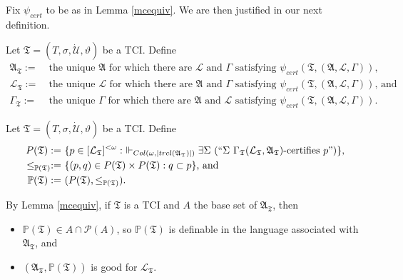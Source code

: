 \documentclass[12pt]{article}
\numberwithin{equation}{section}
\begin{document}
Fix $\psi_{cert}$ to be as in Lemma \ref{mcequiv}. We are then justified in our next definition.

\begin{defi}
Let $\mathfrak{T} = (T, \sigma, \dot{\mathcal{U}}, \vartheta)$ be a TCI. Define
\begin{align*}
    \mathfrak{A}_{\mathfrak{T}} := \ & \text{the unique } \mathfrak{A} \text{ for which there are } \mathcal{L} \text{ and } \Gamma \text{ satisfying } \psi_{cert}(\mathfrak{T}, (\mathfrak{A}, \mathcal{L}, \Gamma)) \text{,} \\
    \mathcal{L}_{\mathfrak{T}} := \ & \text{the unique } \mathcal{L} \text{ for which there are } \mathfrak{A} \text{ and } \Gamma \text{ satisfying } \psi_{cert}(\mathfrak{T}, (\mathfrak{A}, \mathcal{L}, \Gamma)) \text{, and} \\
    \Gamma_{\mathfrak{T}} := \ & \text{the unique } \Gamma \text{ for which there are } \mathfrak{A} \text{ and } \mathcal{L} \text{ satisfying } \psi_{cert}(\mathfrak{T}, (\mathfrak{A}, \mathcal{L}, \Gamma)) \text{.}
\end{align*}
\end{defi}

\begin{defi}
Let $\mathfrak{T} = (T, \sigma, \dot{\mathcal{U}}, \vartheta)$ be a TCI. Define \begin{align*}
    P(\mathfrak{T}) := \ & \{p \in [\mathcal{L}_{\mathfrak{T}}]^{< \omega} : \ \Vdash_{Col(\omega, |trcl(\mathfrak{A}_{\mathfrak{T}})|)} \exists \Sigma \ (``\Sigma \ \Gamma_{\mathfrak{T}} (\mathcal{L}_{\mathfrak{T}}, \mathfrak{A}_{\mathfrak{T}})\text{-certifies } p")\} \text{,} \\
    \leq_{\mathbb{P}(\mathfrak{T})} := \ & \{(p, q) \in P(\mathfrak{T}) \times P(\mathfrak{T}) : q \subset p\} \text{, and} \\
    \mathbb{P}(\mathfrak{T}) := \ & (P(\mathfrak{T}), \leq_{\mathbb{P}(\mathfrak{T})}) \text{.}
\end{align*}
\end{defi}

By Lemma \ref{mcequiv}, if $\mathfrak{T}$ is a TCI and $A$ the base set of $\mathfrak{A}_{\mathfrak{T}}$, then 
\begin{itemize}
    \item $\mathbb{P}(\mathfrak{T}) \in A \cap \mathcal{P}(A)$, so $\mathbb{P}(\mathfrak{T})$ is definable in the language associated with $\mathfrak{A}_{\mathfrak{T}}$, and
    \item $(\mathfrak{A}_{\mathfrak{T}}, \mathbb{P}(\mathfrak{T}))$ is good for $\mathcal{L}_{\mathfrak{T}}$.
\end{itemize}
\end{document}
